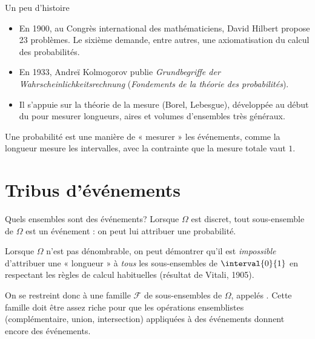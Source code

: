 \documentclass[nuit,charter,pied]{BeamerJS}
\newcommand{\tribu}{\mathcal{F}}
\begin{document}
\begin{frame}[c]{Un peu d'histoire}
\pause
	\begin{itemize}
		\item En 1900, au Congrès international des mathématiciens, David Hilbert propose \num{23} problèmes. \pause Le sixième demande, entre autres, une axiomatisation du calcul des probabilités.\pause
		\item En 1933, Andreï Kolmogorov publie \textit{Grundbegriffe der Wahrscheinlichkeitsrechnung} (\textit{Fondements de la théorie des probabilités}).\pause
		\item Il s'appuie sur la théorie de la mesure (Borel, Lebesgue), développée au début du  pour mesurer longueurs, aires et volumes d'ensembles très généraux.
	\end{itemize}
	\pause
	\begin{lumiere}
		Une probabilité est une manière de « mesurer » les événements, comme la longueur mesure les intervalles, avec la contrainte que la mesure totale vaut \(1\).
	\end{lumiere}
\end{frame}

\section{Tribus d'événements}

\begin{frame}[t]{Quels ensembles sont des événements?}
\pause
	Lorsque \(\Omega\) est discret, tout sous-ensemble de \(\Omega\) est un événement : on peut lui attribuer une probabilité.
	\pause
	\medskip

	Lorsque \(\Omega\) n'est pas dénombrable, on peut démontrer qu'il est \emph{impossible} d'attribuer une « longueur » à \emph{tous} les sous-ensembles de \(\interval{0}{1}\) en respectant les règles de calcul habituelles (résultat de Vitali, 1905).
	\pause
	\begin{lumiere}
		On se restreint donc à une famille \(\tribu\) de sous-ensembles de \(\Omega\), appelés . \pause Cette famille doit être assez riche pour que les opérations ensemblistes (complémentaire, union, intersection) appliquées à des événements donnent encore des événements.
	\end{lumiere}
\end{frame}
\end{document}

